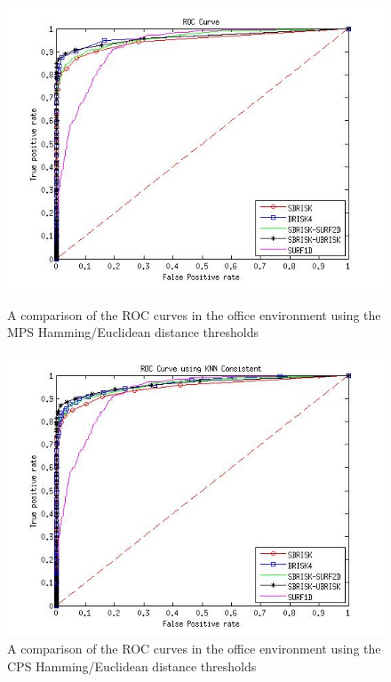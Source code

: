 \documentclass{article}
\begin{document}
\begin{figure}[h!]
\begin{minipage}[b]{0.5\linewidth}
\includegraphics[scale=0.4]{../Drawings/dataset2_ROC_General_Hamming.jpg}
\caption{A comparison of the ROC curves in the office environment using the MPS Hamming/Euclidean distance thresholds}
\label{fig:compareHammingOffice}
\end{minipage}
\hspace{0.5cm}
\begin{minipage}[b]{0.5\linewidth}
\includegraphics[scale=0.4]{../Drawings/dataset2_ROC_General_Hamming_Consistent.jpg}
\caption{A comparison of the ROC curves in the office environment using the CPS Hamming/Euclidean distance thresholds}
\label{fig:compareHammingConsistentOffice}
\end{minipage}
\end{figure}
\end{document}
